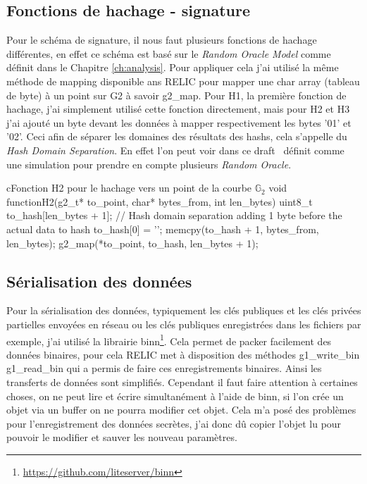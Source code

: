 \subsection{Fonctions de hachage - signature}
Pour le schéma de signature, il nous faut plusieurs fonctions de hachage différentes, en effet ce schéma est basé sur le \textit{Random Oracle Model} comme définit dans le Chapitre \ref{ch:analysis}. Pour appliquer cela j'ai utilisé la même méthode de mapping disponible ans RELIC pour mapper une char array (tableau de byte) à un point sur G2 à savoir g2\_map.
Pour H1, la première fonction de hachage, j'ai simplement utilisé cette fonction directement, mais pour H2 et H3 j'ai ajouté un byte devant les données à mapper respectivement les bytes '01' et '02'. Ceci afin de séparer les domaines des résultats des hashs, cela s'appelle du \textit{Hash Domain Separation}. En effet l'on peut voir dans ce draft~\cite{irtf-cfrg-hash-to-curve} définit comme une simulation pour prendre en compte plusieurs \textit{Random Oracle}.

\begin{sourcebox}{c}{Fonction H2 pour le hachage vers un point de la courbe $\mathbb{G}_2$}
	void functionH2(g2_t* to_point, char* bytes_from, int len_bytes){
		uint8_t to_hash[len_bytes + 1];
		// Hash domain separation adding 1 byte  before the actual data to hash
		to_hash[0] = '';
		memcpy(to_hash + 1, bytes_from, len_bytes);
		g2_map(*to_point, to_hash, len_bytes + 1);
	}
\end{sourcebox}

\subsection{Sérialisation des données}
Pour la sérialisation des données, typiquement les clés publiques et les clés privées partielles envoyées en réseau ou les clés publiques enregistrées dans les fichiers par exemple, j'ai utilisé la librairie binn\footnote{\url{https://github.com/liteserver/binn}}. Cela permet de packer facilement des données binaires, pour cela RELIC met à disposition des méthodes g1\_write\_bin g1\_read\_bin qui a permis de faire ces enregistrements binaires. Ainsi les transferts de données sont simplifiés. Cependant il faut faire attention à certaines choses, on ne peut lire et écrire simultanément à l'aide de binn, si l'on crée un objet via un buffer on ne pourra modifier cet objet. Cela m'a posé des problèmes pour l'enregistrement des données secrètes, j'ai donc dû copier l'objet lu pour pouvoir le modifier et sauver les nouveau paramètres.
